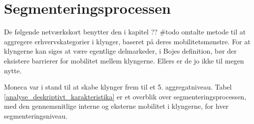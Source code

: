 


% 
% 
% 
% 
% 






%  
% 


\section{Segmenteringsprocessen \label{analyse_deskriptivt_segmenteringsproces}}

De følgende netværkskort benytter den i kapitel ?? \#todo omtalte metode til at aggregere erhvervskategorier i klynger, baseret på deres mobilitetsmønstre. For at klyngerne kan siges at være egentlige delmarkeder, i Bojes definition, bør der eksistere barrierer for mobilitet mellem klyngerne. Ellers er de jo ikke til megen nytte.

Moneca var i stand til at skabe klynger frem til et 5. aggregatniveau. Tabel \ref{analyse_deskriptivt_karakteristika}  er et overblik over segmenteringsprocessen, med den gennemsnitlige interne og eksterne mobilitet i klyngerne, for hver segmenteringsniveau.

% 
\begin{table}[H] \centering
\caption{Karakteristika for segmenteringsprocessen}
\label{tab_analyse_deskriptivt_karakteristika}
\end{table}
%

